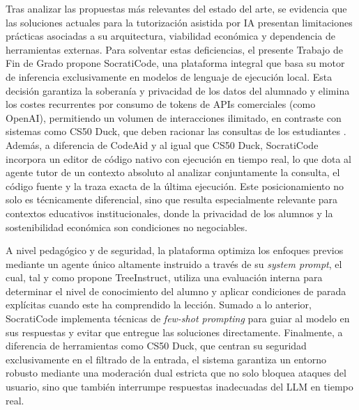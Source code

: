 Tras analizar las propuestas más relevantes del estado del arte, se evidencia que las soluciones actuales para la tutorización asistida por IA presentan limitaciones prácticas asociadas a su arquitectura, viabilidad económica y dependencia de herramientas externas. Para solventar estas deficiencias, el presente Trabajo de Fin de Grado propone SocratiCode, una plataforma integral que basa su motor de inferencia exclusivamente en modelos de lenguaje de ejecución local. Esta decisión garantiza la soberanía y privacidad de los datos del alumnado y elimina los costes recurrentes por consumo de tokens de APIs comerciales (como OpenAI), permitiendo un volumen de interacciones ilimitado, en contraste con sistemas como CS50 Duck, que deben racionar las consultas de los estudiantes \cite{liu2024cs50}. Además, a diferencia de CodeAid y al igual que CS50 Duck, SocratiCode incorpora un editor de código nativo con ejecución en tiempo real, lo que dota al agente tutor de un contexto absoluto al analizar conjuntamente la consulta, el código fuente y la traza exacta de la última ejecución. Este posicionamiento no solo es técnicamente diferencial, sino que resulta especialmente relevante para contextos educativos institucionales, donde la privacidad de los alumnos y la sostenibilidad económica son condiciones no negociables.

A nivel pedagógico y de seguridad, la plataforma optimiza los enfoques previos mediante un agente único altamente instruido a través de su \textit{system prompt}, el cual, tal y como propone TreeInstruct, utiliza una evaluación interna para determinar el nivel de conocimiento del alumno y aplicar condiciones de parada explícitas cuando este ha comprendido la lección. Sumado a lo anterior, SocratiCode implementa técnicas de \textit{few-shot prompting} para guiar al modelo en sus respuestas y evitar que entregue las soluciones directamente. Finalmente, a diferencia de herramientas como CS50 Duck, que centran su seguridad exclusivamente en el filtrado de la entrada, el sistema garantiza un entorno robusto mediante una moderación dual estricta que no solo bloquea ataques del usuario, sino que también interrumpe respuestas inadecuadas del LLM en tiempo real.